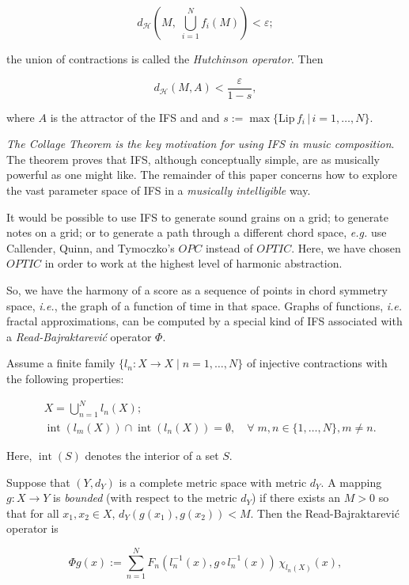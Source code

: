 \documentclass[english,11pt,letterpaper,onecolumn]{scrartcl}
\numberwithin{equation}{section}
\newcommand{\st}{\,|\,}
\newcommand{\calH}{\mathcal{H}}
\newcommand{\Int}{\mathop{\mathrm{int}}}
\newcommand{\be}{\begin{equation}}
\newcommand{\ee}{\end{equation}}
\begin{document}
\be\label{hutchop}
d_\calH \left(M, \;\bigcup_{i=1}^N f_i (M) \right) < \varepsilon;
\ee

\noindent the union of contractions is called the \textit{Hutchinson operator}.
Then

\[
d_\calH (M, A) < \frac{\varepsilon}{1-s},
\]

\noindent where $A$ is the attractor of the IFS and  and $s :=
\max\{\mathrm{Lip}\,f_i\st
i = 1, \ldots, N\}$.

\textit{The Collage Theorem is the key motivation for using IFS in music
composition}. The theorem proves that IFS, although conceptually simple, are as
musically powerful as one might like. The remainder of this paper concerns how
to explore the vast parameter space of IFS in a \textit{musically intelligible}
way.

It would be possible to use IFS to generate sound grains on a grid; to generate
notes on a grid; or to generate a path through a different chord space,
\textit{e.g.} use Callender, Quinn, and Tymoczko's $OPC$ instead of $OPTIC$.
Here, we have chosen $OPTIC$ in order to work at the highest level of harmonic
abstraction.

So, we have the harmony of a score as a sequence of points in chord symmetry
space, \textit{i.e.}, the graph of a function of time in that space. Graphs of
functions, \textit{i.e.} fractal approximations, can be computed by a special
kind of IFS associated with a \textit{Read-Bajraktarevi\'c} operator $\Phi$.

Assume a finite family $\{l_n : X\to X \mid n = 1, \ldots, N\}$ of injective
contractions with the following properties:

\begin{align}
&X = \bigcup_{n=1}^N l_n(X);\label{union}\\
&\Int (l_m(X))\cap \Int(l_n(X)) = \emptyset, \quad\forall\;m, n\in \{1,\ldots,
N\}, m\neq n.
\end{align}

\noindent Here, $\Int (S)$ denotes the interior of a set $S$.

Suppose that $(Y,d_Y)$ is a complete metric space with metric $d_Y$. A mapping
$g:X\to Y$ is \emph{bounded} (with respect to the metric $d_Y$) if
there exists an $M > 0$ so that for all $x_1, x_2\in X$, $d_Y(g(x_1),g(x_2)) <
M$. Then the Read-Bajraktarevi\'c operator is

\be\label{RB}
\Phi g (x) := \sum\limits_{n=1}^N F_n (l_n^{-1} (x), g\circ l_n^{-1}
(x))\,\chi_{l_n(X)}(x),
\ee
\end{document}
